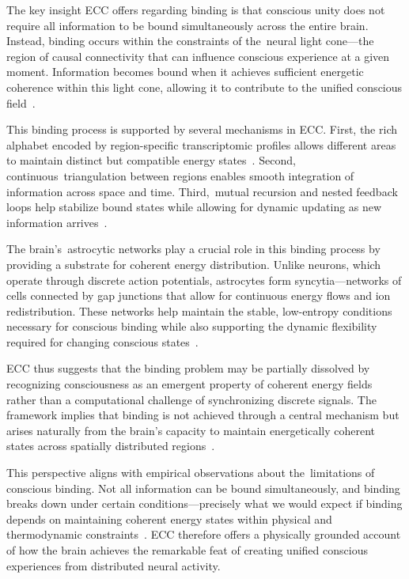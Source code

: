 The key insight ECC offers regarding binding is that conscious unity does not require all information to be bound simultaneously across the entire brain. Instead, binding occurs within the constraints of the~neural light cone—the region of causal connectivity that can influence conscious experience at a given moment. Information becomes bound when it achieves sufficient energetic coherence within this light cone, allowing it to contribute to the unified conscious field~\cite{zheng2025unbearable}.

This binding process is supported by several mechanisms in ECC. First, the rich alphabet encoded by region-specific transcriptomic profiles allows different areas to maintain distinct but compatible energy states~\cite{siletti2023transcriptomic}. Second, continuous~triangulation between regions enables smooth integration of information across space and time. Third,~mutual recursion and nested feedback loops help stabilize bound states while allowing for dynamic updating as new information arrives~\cite{van2025processes}.

The brain's~astrocytic networks play a crucial role in this binding process by providing a substrate for coherent energy distribution. Unlike neurons, which operate through discrete action potentials, astrocytes form syncytia—networks of cells connected by gap junctions that allow for continuous energy flows and ion redistribution. These networks help maintain the stable, low-entropy conditions necessary for conscious binding while also supporting the dynamic flexibility required for changing conscious states~\cite{pellerin2004neuroenergetics}.

ECC thus suggests that the binding problem may be partially dissolved by recognizing consciousness as an emergent property of coherent energy fields rather than a computational challenge of synchronizing discrete signals. The framework implies that binding is not achieved through a central mechanism but arises naturally from the brain's capacity to maintain energetically coherent states across spatially distributed regions~\cite{freeman2007}.

This perspective aligns with empirical observations about the~limitations of conscious binding. Not all information can be bound simultaneously, and binding breaks down under certain conditions—precisely what we would expect if binding depends on maintaining coherent energy states within physical and thermodynamic constraints~\cite{attwell2001}. ECC therefore offers a physically grounded account of how the brain achieves the remarkable feat of creating unified conscious experiences from distributed neural activity.

